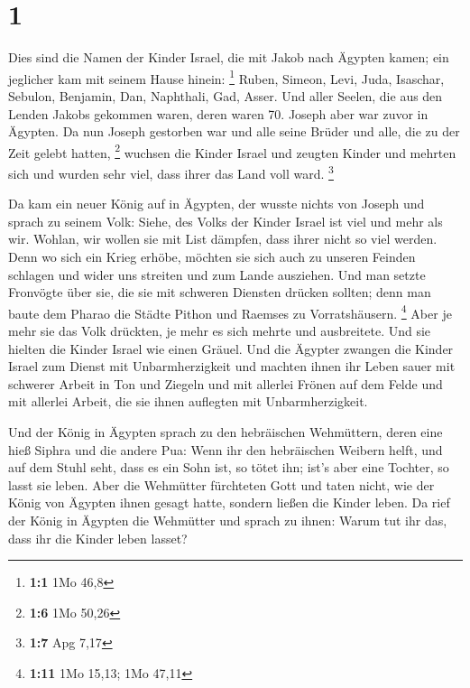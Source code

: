 \hypertarget{section}{%
\section{1}\label{section}}

 Dies sind die Namen der Kinder Israel, die mit Jakob nach
Ägypten kamen; ein jeglicher kam mit seinem Hause hinein: \footnote{\textbf{1:1}
  1Mo 46,8}  Ruben, Simeon, Levi, Juda, 
Isaschar, Sebulon, Benjamin,  Dan, Naphthali, Gad, Asser.
 Und aller Seelen, die aus den Lenden Jakobs gekommen waren,
deren waren 70. Joseph aber war zuvor in Ägypten.  Da nun
Joseph gestorben war und alle seine Brüder und alle, die zu der Zeit
gelebt hatten, \footnote{\textbf{1:6} 1Mo 50,26}  wuchsen
die Kinder Israel und zeugten Kinder und mehrten sich und wurden sehr
viel, dass ihrer das Land voll ward. \footnote{\textbf{1:7} Apg 7,17}

 Da kam ein neuer König auf in Ägypten, der wusste nichts
von Joseph  und sprach zu seinem Volk: Siehe, des Volks der
Kinder Israel ist viel und mehr als wir.  Wohlan, wir
wollen sie mit List dämpfen, dass ihrer nicht so viel werden. Denn wo
sich ein Krieg erhöbe, möchten sie sich auch zu unseren Feinden schlagen
und wider uns streiten und zum Lande ausziehen.  Und man
setzte Fronvögte über sie, die sie mit schweren Diensten drücken
sollten; denn man baute dem Pharao die Städte Pithon und Raemses zu
Vorratshäusern. \footnote{\textbf{1:11} 1Mo 15,13; 1Mo 47,11}
 Aber je mehr sie das Volk drückten, je mehr es sich mehrte
und ausbreitete. Und sie hielten die Kinder Israel wie einen Gräuel.
 Und die Ägypter zwangen die Kinder Israel zum Dienst mit
Unbarmherzigkeit  und machten ihnen ihr Leben sauer mit
schwerer Arbeit in Ton und Ziegeln und mit allerlei Frönen auf dem Felde
und mit allerlei Arbeit, die sie ihnen auflegten mit Unbarmherzigkeit.

 Und der König in Ägypten sprach zu den hebräischen
Wehmüttern, deren eine hieß Siphra und die andere Pua: 
Wenn ihr den hebräischen Weibern helft, und auf dem Stuhl seht, dass es
ein Sohn ist, so tötet ihn; ist's aber eine Tochter, so lasst sie leben.
 Aber die Wehmütter fürchteten Gott und taten nicht, wie
der König von Ägypten ihnen gesagt hatte, sondern ließen die Kinder
leben.  Da rief der König in Ägypten die Wehmütter und
sprach zu ihnen: Warum tut ihr das, dass ihr die Kinder leben lasset?

